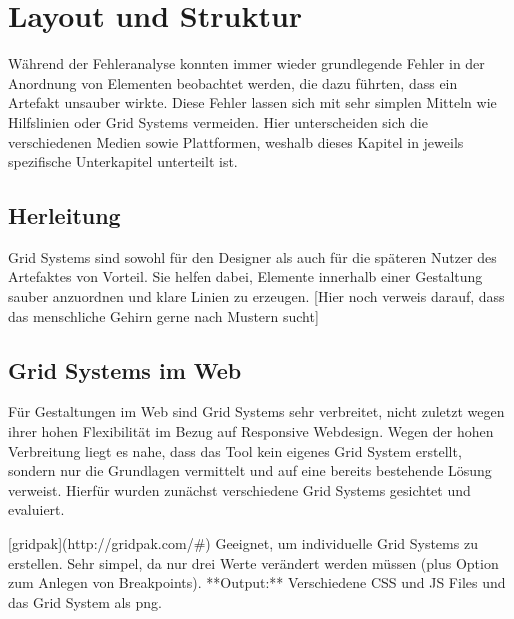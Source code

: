 
\chapter{Layout und Struktur} %

\label{LayoutStruktur} %



Während der Fehleranalyse konnten immer wieder grundlegende Fehler in der Anordnung von Elementen beobachtet werden, die dazu führten, dass ein Artefakt unsauber wirkte.
Diese Fehler lassen sich mit sehr simplen Mitteln wie Hilfslinien oder Grid Systems vermeiden.
Hier unterscheiden sich die verschiedenen Medien sowie Plattformen, weshalb dieses Kapitel in jeweils spezifische Unterkapitel unterteilt ist.

\section{Herleitung}
Grid Systems sind sowohl für den Designer als auch für die späteren Nutzer des Artefaktes von Vorteil. Sie helfen dabei, Elemente innerhalb einer Gestaltung sauber anzuordnen und klare Linien zu erzeugen.
[Hier noch verweis darauf, dass das menschliche Gehirn gerne nach Mustern sucht]

\section{Grid Systems im Web}
Für Gestaltungen im Web sind Grid Systems sehr verbreitet, nicht zuletzt wegen ihrer hohen Flexibilität im Bezug auf Responsive Webdesign.
Wegen der hohen Verbreitung liegt es nahe, dass das Tool kein eigenes Grid System erstellt, sondern nur die Grundlagen vermittelt und auf eine bereits bestehende Lösung verweist.
Hierfür wurden zunächst verschiedene Grid Systems gesichtet und evaluiert.

[gridpak](http://gridpak.com/#)
Geeignet, um individuelle Grid Systems zu erstellen. Sehr simpel, da nur drei Werte verändert werden müssen (plus Option zum Anlegen von Breakpoints).
**Output:** Verschiedene CSS und JS Files und das Grid System als png.

